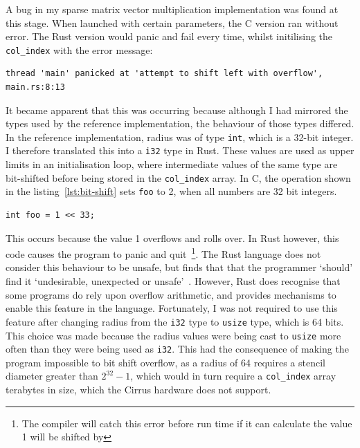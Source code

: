 A bug in my sparse matrix vector multiplication implementation was found at this stage. When launched with certain parameters, the C version ran without error. The Rust version would panic and fail every time, whilst initilising the \texttt{col\_index} with the error message:


\begin{code}
\begin{verbatim}
thread 'main' panicked at 'attempt to shift left with overflow', main.rs:8:13
\end{verbatim}
\label{lst:rutsc-bit}
\end{code}

It became apparent that this was occurring because although I had mirrored the types used by the reference implementation, the behaviour of those types differed. In the reference implementation, radius was of type \texttt{int}, which is a 32-bit integer. I therefore translated this into a \texttt{i32} type in Rust. These values are used as upper limits in an initialisation loop, where intermediate values of the same type are bit-shifted before being stored in the \texttt{col\_index} array. In C, the operation shown in the listing~\ref{lst:bit-shift} sets \texttt{foo} to 2, when all numbers are 32 bit integers. 
\pagebreak
\begin{code}
\begin{verbatim}
int foo = 1 << 33;
\end{verbatim}
\label{lst:bit-shift}
\end{code}

This occurs because the value 1 overflows and rolls over. In Rust however, this code causes the program to panic and quit~\footnote{The compiler will catch this error before run time if it can calculate the value 1 will be shifted by}. The Rust language does not consider this behaviour to be unsafe, but finds that that the programmer `should' find it `undesirable, unexpected or unsafe'~\cite{rustunsafe}. However, Rust does recognise that some programs do rely upon overflow arithmetic, and provides mechanisms to enable this feature in the language. Fortunately, I was not required to use this feature after changing radius from the \texttt{i32} type to \texttt{usize} type, which is 64 bits. This choice was made because the radius values were being cast to \texttt{usize} more often than they were being used as \texttt{i32}. This had the consequence of making the program impossible to bit shift overflow, as a radius of 64 requires a stencil diameter greater than $2^{32}-1$, which would in turn require a \texttt{col\_index} array terabytes in size, which the Cirrus hardware does not support.

